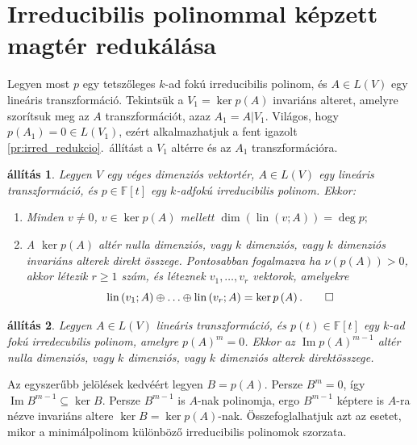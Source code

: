 \documentclass[a4paper, showtrims]{memoir}
\makeatletter
\renewenvironment{proof}[1][\proofname]
    {\par\pushQED{\qed}%
    \normalfont \topsep6\p@\@plus6\p@\relax
    \trivlist
    \item[\hskip\labelsep
        \itshape
    #1\@addpunct{:}]\ignorespaces}
    {\popQED\endtrivlist\@endpefalse}
\theoremstyle{plain}
\newtheorem{proposition}{állítás}[chapter]
\theoremstyle{remark}
\theoremstyle{definition}
\DeclareMathOperator{\lin}{lin}
\DeclareMathOperator{\im}{Im}
\makeatother
\begin{document}
\section{Irreducibilis polinommal képzett magtér redukálása}
Legyen most $p$ egy tetszőleges $k$-ad fokú irreducibilis polinom,
és $A\in L(V)$ egy lineáris transzformáció.
Tekintsük a $V_1=\ker p\left( A \right)$ invariáns alteret, amelyre szorítsuk meg az $A$
transzformációt, azaz $A_1=A|V_1$.
Világos, hogy $p\left( A_1 \right)=0\in L\left( V_1 \right)$,
ezért alkalmazhatjuk a fent igazolt \ref{pr:irred_redukcio}.~állítást
a $V_1$ altérre és az $A_1$ transzformációra.
\begin{proposition}\label{pr:csaba}
	Legyen $V$ egy véges dimenziós vektortér, $A\in L\left( V \right)$ egy lineáris transzformáció,
	és $p\in\mathbb{F}\left[ t \right]$ egy $k$-adfokú irreducibilis polinom.
	Ekkor:
	\begin{enumerate}
		\item Minden $v\neq 0$, $v\in\ker p\left( A \right)$ mellett
		      \(
		      \dim\left( \lin(v;A) \right)=\deg p;
		      \)
		\item A $\ker p\left( A \right)$ altér nulla dimenziós,
		      vagy $k$ dimenziós, vagy $k$ dimenziós invariáns alterek direkt összege.
		      Pontosabban fogalmazva
		      ha $\nu\left(p(A) \right)>0$, akkor létezik $r\geq 1$ szám,
		      és léteznek $v_1,\ldots,v_r$ vektorok, amelyekre
		      \[
			      \lin\left( v_1;A \right)\oplus\ldots\oplus \lin\left( v_r;A \right)
			      =
			      \ker p\left( A \right).
			      \qedhere
		      \]
	\end{enumerate}
\end{proposition}
\begin{proposition}
    Legyen $A\in L\left( V \right)$ lineáris transzformáció, és $p(t)\in\mathbb{F}[t]$ egy $k$-ad fokú 
    irredecubilis polinom,
    amelyre $p\left( A \right)^m=0$.
    Ekkor az $\im p\left( A \right)^{m-1}$ altér nulla dimenziós, 
    vagy $k$ dimenziós, vagy $k$ dimenziós alterek direktösszege.
\end{proposition}
\begin{proof}
    Az egyszerűbb jelölések kedvéért legyen $B=p\left( A \right)$.
    Persze $B^m=0$, így $\im B^{m-1}\subseteq\ker B $.
    Persze $B^{m-1}$ is $A$-nak polinomja, 
    ergo $B^{m-1}$ képtere is $A$-ra nézve invariáns altere $\ker B=\ker p\left( A \right)$-nak.
\end{proof}
Összefoglalhatjuk azt az esetet,
mikor a minimálpolinom különböző irreducibilis polinomok szorzata.
\end{document}
